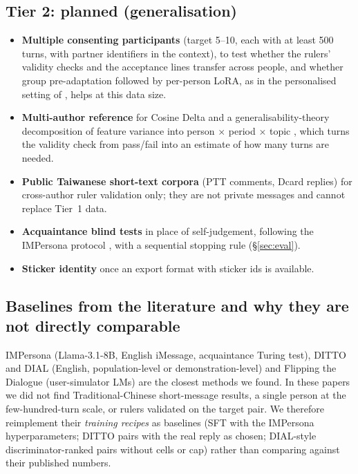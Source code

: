 \subsection{Tier 2: planned (generalisation)}
\label{sec:tier2}

\begin{itemize}
\item \textbf{Multiple consenting participants} (target 5--10, each with at least 500 turns, with partner identifiers in the context), to test whether the rulers' validity checks and the acceptance lines transfer across people, and whether group pre-adaptation followed by per-person LoRA, as in the personalised setting of \citet{ntt2024}, helps at this data size.
\item \textbf{Multi-author reference} for Cosine Delta and a generalisability-theory decomposition of feature variance into person $\times$ period $\times$ topic \citep{cronbach1972dependability}, which turns the validity check from pass/fail into an estimate of how many turns are needed.
\item \textbf{Public Taiwanese short-text corpora} (PTT comments, Dcard replies) for cross-author ruler validation only; they are not private messages and cannot replace Tier~1 data.
\item \textbf{Acquaintance blind tests} in place of self-judgement, following the IMPersona protocol \citep{shi2025impersona}, with a sequential stopping rule (\S\ref{sec:eval}).
\item \textbf{Sticker identity} once an export format with sticker ids is available.
\end{itemize}

\subsection{Baselines from the literature and why they are not directly comparable}
\label{sec:litbaselines}

IMPersona \citep{shi2025impersona} (Llama-3.1-8B, English iMessage, acquaintance Turing test), DITTO \citep{shaikh2025ditto} and DIAL \citep{zhu2025dial} (English, population-level or demonstration-level) and Flipping the Dialogue \citep{naous2026flipping} (user-simulator LMs) are the closest methods we found.
In these papers we did not find Traditional-Chinese short-message results, a single person at the few-hundred-turn scale, or rulers validated on the target pair.
We therefore reimplement their \emph{training recipes} as baselines (SFT with the IMPersona hyperparameters; DITTO pairs with the real reply as chosen; DIAL-style discriminator-ranked pairs without cells or cap) rather than comparing against their published numbers.

